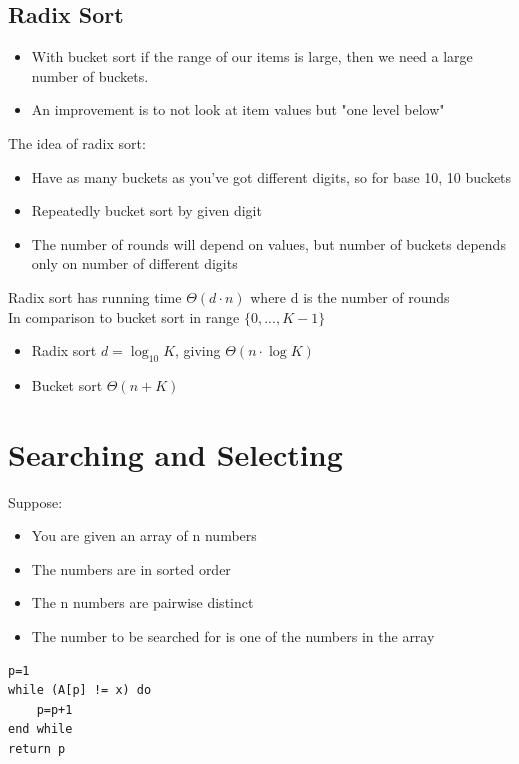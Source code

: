 \documentclass{article}[18pt]
\begin{document}
\subsection{Radix Sort}
\begin{itemize}
	\item With bucket sort if the range of our items is large, then we need a large number of buckets.
	\item An improvement is to not look at item values but "one level below"
\end{itemize}
The idea of radix sort:
\begin{itemize}
	\item Have as many buckets as you've got different digits, so for base 10, 10 buckets
	\item Repeatedly bucket sort by given digit
	\item The number of rounds will depend on values, but number of buckets depends only on number of different digits
\end{itemize}
Radix sort has running time $\Theta(d\cdot n)$ where d is the number of rounds\\
In comparison to bucket sort in range $\{0,...,K-1\}$
\begin{itemize}
	\item Radix sort $d=\log_{10}K$, giving $\Theta(n\cdot \log K)$
	\item Bucket sort $\Theta(n+K)$
\end{itemize}
\section{Searching and Selecting}
Suppose:
\begin{itemize}
	\item You are given an array of n numbers
	\item The numbers are in sorted order
	\item The n numbers are pairwise distinct
	\item The number to be searched for is one of the numbers in the array 
\end{itemize}
\begin{lstlisting}[caption=int trivial\_search ({int A[1...n], int x})]
p=1
while (A[p] != x) do
	p=p+1
end while
return p
\end{lstlisting}
\end{document}
